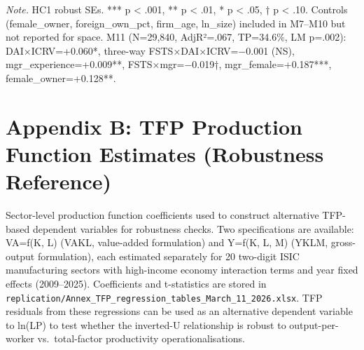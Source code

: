 \documentclass[
  12pt]{article}
\begin{document}
\emph{Note.} HC1 robust SEs. *** p \textless{} .001, ** p \textless{}
.01, * p \textless{} .05, † p \textless{} .10. Controls (female\_owner,
foreign\_own\_pct, firm\_age, ln\_size) included in M7--M10 but not
reported for space. M11 (N=29,840, AdjR²=.067, TP=34.6\%, LM p=.002):
DAI×ICRV=+0.060*, three-way FSTS×DAI×ICRV=−0.001 (NS),
mgr\_experience=+0.009**, FSTS×mgr=−0.019†, mgr\_female=+0.187***,
female\_owner=+0.128**.

\hypertarget{appendix-b-tfp-production-function-estimates-robustness-reference}{%
\section{Appendix B: TFP Production Function Estimates (Robustness
Reference)}\label{appendix-b-tfp-production-function-estimates-robustness-reference}}

Sector-level production function coefficients used to construct
alternative TFP-based dependent variables for robustness checks. Two
specifications are available: VA=f(K, L) (VAKL, value-added formulation)
and Y=f(K, L, M) (YKLM, gross-output formulation), each estimated
separately for 20 two-digit ISIC manufacturing sectors with high-income
economy interaction terms and year fixed effects (2009--2025).
Coefficients and t-statistics are stored in
\texttt{replication/Annex\_TFP\_regression\_tables\_March\_11\_2026.xlsx}.
TFP residuals from these regressions can be used as an alternative
dependent variable to ln(LP) to test whether the inverted-U relationship
is robust to output-per-worker vs.~total-factor productivity
operationalisations.
\end{document}
